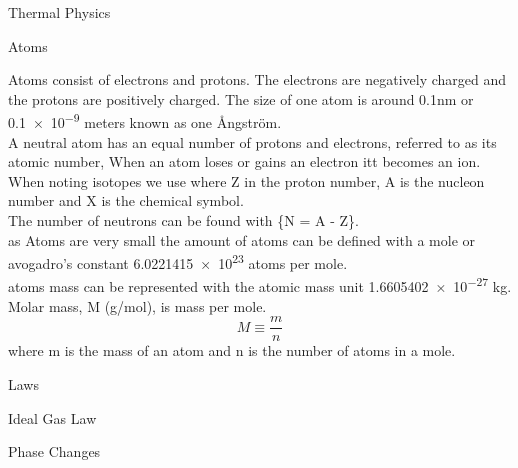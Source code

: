 \documentclass{article}
\newcommand\hr{\par\vspace{-.5\ht\strutbox}\noindent\hrulefill\par}
\newcommand\br{\vspace{0.5cm}}
\begin{document}
\Huge \raggedright Thermal Physics \\ \vspace{1cm}
\begin{large}
    \hr
    \LARGE \center Atoms \\
    \br
    
    \raggedright
    \large Atoms consist of electrons and protons. The electrons are negatively charged and the protons are positively charged. The size of one atom is around 0.1nm or \num{0.1e-9} meters known as one Ångström. \\
    \large A neutral atom has an equal number of protons and electrons, referred to as its atomic number, When an atom loses or gains an electron itt becomes an ion. When noting isotopes we use  where Z in the proton number, A is the nucleon number and X is the chemical symbol. \\ 
    \large The number of neutrons can be found with \{N = A - Z\}. \\ 
    \large as Atoms are very small the amount of atoms can be defined with a mole or avogadro's constant \num{6.0221415e23} atoms per mole. \\
    \large atoms mass can be represented with the atomic mass unit \num{1.6605402e-27} kg. \\
    \large Molar mass, M (g/mol), is mass per mole. \[M \equiv \frac{m}{n}\] where m is the mass of an atom and n is the number of atoms in a mole. \\




    \hr
    \LARGE \center Laws \\
    \br
    \raggedright
    



    \hr
    \LARGE \center Ideal Gas Law \\
    \br
    \raggedright



    \hr
    \LARGE \center Phase Changes \\
    \br
    \raggedright

    \hr

\end{large}
\end{document}

